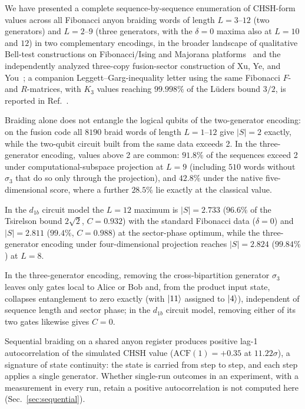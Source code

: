 \documentclass[aps,pra,twocolumn,superscriptaddress,longbibliography,floatfix,nofootinbib]{revtex4-2}
\begin{document}
We have presented a complete sequence-by-sequence enumeration of
CHSH-form values across all Fibonacci anyon braiding words of length
$L=3$--$12$ (two generators) and $L=2$--$9$ (three generators, with the
$\delta = 0$ maxima also at $L = 10$ and $12$) in two
complementary encodings, in the broader landscape of qualitative
Bell-test constructions on Fibonacci/Ising and Majorana
platforms~\cite{Brennen2009,ChangChuMa2017,Drummond2014,RomitoGefen2017,ClarkeSauDasSarma2016}
and the independently analyzed three-copy fusion-sector
construction of Xu, Ye, and You~\cite{Xu2025}; a companion
Leggett--Garg-inequality letter using the same Fibonacci $F$- and
$R$-matrices, with $K_3$ values reaching $99.998\%$ of the L\"uders bound
$3/2$, is reported in Ref.~\cite{Sayim2026LGI}.

Braiding alone does not entangle the logical qubits of the two-generator
encoding: on the fusion code all $8190$ braid words of length
$L=1$--$12$ give $|S| = 2$ exactly, while the two-qubit circuit built
from the same data exceeds 2. In the three-generator encoding, values
above 2 are common: $91.8\%$ of the sequences exceed 2 under
computational-subspace projection at $L=9$ (including $510$ words
without $\sigma_3$ that do so only through the projection), and $42.8\%$
under the native five-dimensional score, where a further $28.5\%$ lie
exactly at the classical value.

In the $d_{1b}$ circuit model the $L=12$ maximum is $|S|=2.733$
($96.6\%$ of the Tsirelson bound $2\sqrt{2}$, $C=0.932$) with the
standard Fibonacci data ($\delta = 0$) and $|S|=2.811$ ($99.4\%$,
$C=0.988$) at the sector-phase optimum, while the three-generator
encoding under four-dimensional projection reaches $|S|=2.824$
($99.84\%$) at $L=8$.

In the three-generator encoding, removing the cross-bipartition
generator $\sigma_3$ leaves only gates local to Alice or Bob and, from
the product input state, collapses entanglement to zero exactly (with
$\ket{11}$ assigned to $\ket{4}$), independent of sequence length and
sector phase; in the $d_{1b}$ circuit model, removing either of its two
gates likewise gives $C=0$.

Sequential braiding on a shared anyon register produces positive
lag-1 autocorrelation of the simulated CHSH value ($\text{ACF}(1)=+0.35$ at
$11.22\sigma$), a signature of state continuity: the state is carried
from step to step, and each step applies a single generator. Whether
single-run outcomes in an experiment, with a measurement in every run,
retain a positive autocorrelation is not computed here
(Sec.~\ref{sec:sequential}).
\end{document}
